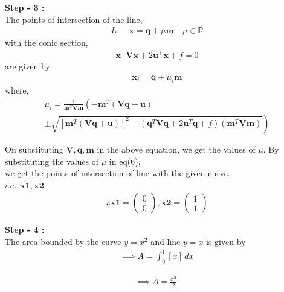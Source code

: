 \documentclass[10pt,a4paper]{report}
\newcommand{\myvec}[1]{\ensuremath{\begin{pmatrix}#1\end{pmatrix}}}
\let\vec\mathbf
\providecommand{\brak}[1]{\ensuremath{\left(#1\right)}}
\providecommand{\lbrak}[1]{\ensuremath{\left(#1\right.}}
\providecommand{\rbrak}[1]{\ensuremath{\left.#1\right)}}
\providecommand{\sbrak}[1]{\ensuremath{{}\left[#1\right]}}
\begin{document}
\begin{multicols}{2}
\raggedright \textbf{Step - 3 :}\\ \vspace{2mm}
The points of intersection of the line, \\ 
\begin{align}
L: \quad \vec{x} = \vec{q} + \mu \vec{m} \quad \mu \in \mathbb{R}
\end{align}
with the conic section, \\ 
\begin{align}
	\vec{x}^{\top}\vec{V}\vec{x} + 2\vec{u}^{\top} \vec{x} + f = 0
\end{align}
are given by \\
\begin{align}
\vec{x}_i = \vec{q} + \mu_i \vec{m}
\end{align}
where, \\
{\tiny
\begin{multline}
\mu_i = \frac{1}
{
\vec{m}^T\vec{V}\vec{m}
}
\lbrak{-\vec{m}^T\brak{\vec{V}\vec{q}+\vec{u}}}
\\
\pm
\rbrak{\sqrt{
\sbrak{
\vec{m}^T\brak{\vec{V}\vec{q}+\vec{u}}
}^2
-
\brak
{
\vec{q}^T\vec{V}\vec{q} + 2\vec{u}^T\vec{q} +f
}
\brak{\vec{m}^T\vec{V}\vec{m}}
}
}
\end{multline}
}
\raggedright On substituting $\vec{V},\vec{q} ,\vec{m}$ in the above equation,
we get the values of $\mu$. By substituting the values of $\mu$ in eq(6), \\we get the points of intersection of line with the given curve. \\
\centering $i.e., \vec{x1},\vec{x2}$\\ 

\begin{align}
\therefore \vec{x1}=\myvec{0\\0} , \vec{x2}=\myvec{1\\1}
\end{align}

\raggedright \textbf{Step - 4 :}\\ \vspace{2mm}
The area bounded by the curve $y=x^2$ and line $y=x$ is given by\\

\begin{align}
\implies A=\int_{0}^{1} [x] \,dx
\end{align}

\begin{align}
\implies A=\frac{x^2}{2} \
\end{align}


\end{multicols}
\end{document}
